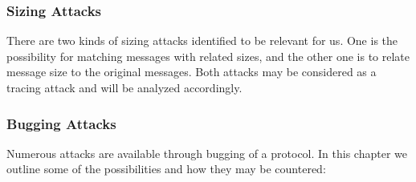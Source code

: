 \subsubsection{Sizing Attacks}
There are two kinds of sizing attacks identified to be relevant for us. One is the possibility for matching messages with related sizes, and the other one is to relate message size to the original messages. Both attacks may be considered as a tracing attack and will be analyzed accordingly.

\subsubsection{Bugging Attacks}
Numerous attacks are available through bugging of a protocol. In this chapter we outline some of the possibilities and how they may be countered:

